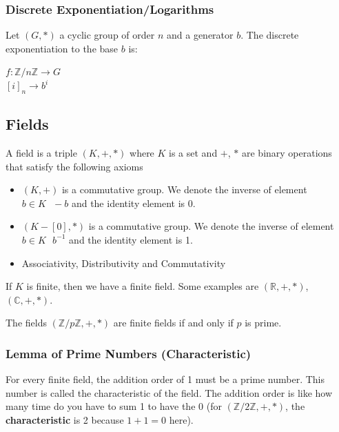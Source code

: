 \documentclass{article}
\begin{document}
\subsubsection{Discrete Exponentiation/Logarithms} Let $ (G, *) $ a cyclic group of order $ n $ and a generator $ b $. The discrete exponentiation to the base $ b $ is:
\begin{center}
$ f: \mathbb{Z}/n\mathbb{Z} \rightarrow G $\\
$ [i]_n \rightarrow b^i $
\end{center} 

\subsection{Fields}
A field is a triple $ (K, +, *) $ where $ K $ is a set and $ + $, $ * $ are binary operations that satisfy the following axioms
\begin{itemize}
\item $ (K, +) $ is a commutative group. We denote the inverse of element $ b \in K \textit{  } -b $ and the identity element is 0.
\item $ (K - [0], *) $ is a commutative group. We denote the inverse of element $ b \in K \textit{  } b^{-1} $ and the identity element is 1.
\item Associativity, Distributivity and Commutativity
\end{itemize}
If $ K $ is finite, then we have a finite field. Some examples are $ (\mathbb{R}, +, *) $, $ (\mathbb{C}, +, *) $. 

\begin{tcolorbox}[width=12.1cm, leftrule=3mm]
The fields $ (\mathbb{Z}/p\mathbb{Z}, +, *) $ are finite fields if and only if $ p $ is prime.
\end{tcolorbox}

\subsubsection{Lemma of Prime Numbers (Characteristic)} For every finite field, the addition order of 1 must be a prime number. This number is called the characteristic of the field. The addition order is like how many time do you have to sum 1 to have the 0 (for $ (\mathbb{Z}/2\mathbb{Z}, +, *) $, the \textbf{characteristic} is 2 because $ 1 + 1 = 0 $ here).
\end{document}
